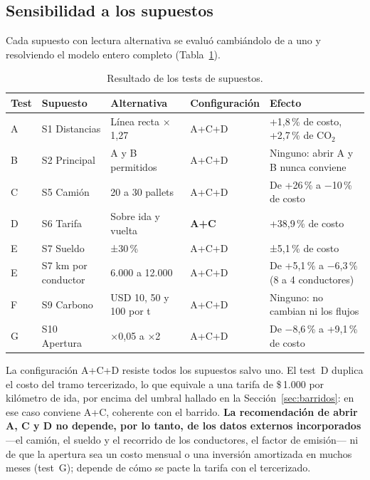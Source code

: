 \documentclass[10pt,a4paper]{article}
\begin{document}
\subsection{Sensibilidad a los supuestos}
\label{sec:tests}

Cada supuesto con lectura alternativa se evaluó cambiándolo de a uno y
resolviendo el modelo entero completo (Tabla~\ref{tab:tests}).

\begin{table}[H]
\centering\footnotesize
\caption{Resultado de los tests de supuestos.}
\label{tab:tests}
\begin{tabularx}{\linewidth}{@{}llllX@{}}
\toprule
\textbf{Test} & \textbf{Supuesto} & \textbf{Alternativa} & \textbf{Configuración} & \textbf{Efecto} \\
\midrule
A & S1 Distancias        & Línea recta × 1,27     & A+C+D & +1,8\,\% de costo, +2,7\,\% de CO$_2$ \\
B & S2 Principal         & A y B permitidos       & A+C+D & Ninguno: abrir A y B nunca conviene \\
C & S5 Camión            & 20 a 30 pallets        & A+C+D & De +26\,\% a $-$10\,\% de costo \\
D & S6 Tarifa            & Sobre ida y vuelta     & \textbf{A+C} & +38,9\,\% de costo \\
E & S7 Sueldo            & ±30\,\%                & A+C+D & ±5,1\,\% de costo \\
E & S7 km por conductor  & 6.000 a 12.000         & A+C+D & De +5,1\,\% a $-$6,3\,\% (8 a 4 conductores) \\
F & S9 Carbono           & USD 10, 50 y 100 por t & A+C+D & Ninguno: no cambian ni los flujos \\
G & S10 Apertura         & ×0,05 a ×2             & A+C+D & De $-$8,6\,\% a +9,1\,\% de costo \\
\bottomrule
\end{tabularx}
\end{table}

La configuración A+C+D resiste todos los supuestos salvo uno. El test~D
duplica el costo del tramo tercerizado, lo que equivale a una tarifa de
\$\,1.000 por kilómetro de ida, por encima del umbral hallado en la
Sección~\ref{sec:barridos}: en ese caso conviene A+C, coherente con el
barrido. \textbf{La recomendación de abrir A, C y D no depende, por lo tanto,
de los datos externos incorporados} —el camión, el sueldo y el recorrido de
los conductores, el factor de emisión— ni de que la apertura sea un costo
mensual o una inversión amortizada en muchos meses (test~G); depende de cómo
se pacte la tarifa con el tercerizado.
\end{document}
